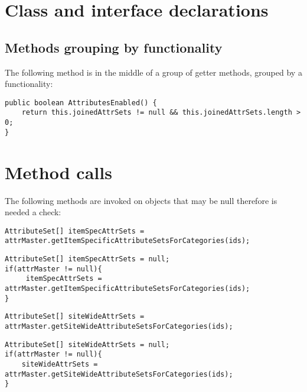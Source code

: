 \section{Class and interface declarations}
\subsection{Methods grouping by functionality}
The following method is in the middle of a group of getter methods, grouped by a functionality:
\begin{lstlisting}[firstnumber=330, caption={AttributesEnabled method in the middle of getters}]
public boolean AttributesEnabled() {
    return this.joinedAttrSets != null && this.joinedAttrSets.length > 0;
}
\end{lstlisting}
\section{Method calls}
The following methods are invoked on objects that may be null therefore is needed a check:

\begin{lstlisting}[firstnumber=93, caption={getItemSpecificAttributeSetsForCategories invocation}]
 AttributeSet[] itemSpecAttrSets = attrMaster.getItemSpecificAttributeSetsForCategories(ids);
\end{lstlisting}
\begin{lstlisting}[firstnumber=93, caption={getItemSpecificAttributeSetsForCategories invocation possible solution}]
AttributeSet[] itemSpecAttrSets = null;
if(attrMaster != null){
     itemSpecAttrSets = attrMaster.getItemSpecificAttributeSetsForCategories(ids);
}
\end{lstlisting}
\noindent\makebox[\linewidth]{\rule{\linewidth}{0.4pt}}

\begin{lstlisting}[firstnumber=94, caption={getSiteWideAttributeSetsForCategories invocation}]
AttributeSet[] siteWideAttrSets = attrMaster.getSiteWideAttributeSetsForCategories(ids);
\end{lstlisting}
\begin{lstlisting}[firstnumber=94, caption={getSiteWideAttributeSetsForCategories invocation possible solution}]
AttributeSet[] siteWideAttrSets = null;
if(attrMaster != null){
    siteWideAttrSets = attrMaster.getSiteWideAttributeSetsForCategories(ids);
}
\end{lstlisting}
\noindent\makebox[\linewidth]{\rule{\linewidth}{0.4pt}}

